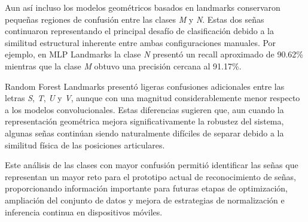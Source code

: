 	Aun así incluso los modelos geométricos basados en landmarks conservaron pequeñas regiones de confusión entre las clases \textit{M} y \textit{N}. Estas dos señas continuaron representando el principal desafío de clasificación debido a la similitud estructural inherente entre ambas configuraciones manuales. Por ejemplo, en MLP Landmarks la clase \textit{N} presentó un recall aproximado de 90.62\% mientras que la clase \textit{M} obtuvo una precisión cercana al 91.17\%.
	
	Random Forest Landmarks presentó ligeras confusiones adicionales entre las letras \textit{S}, \textit{T}, \textit{U} y \textit{V}, aunque con una magnitud considerablemente menor respecto a los modelos convolucionales. Estas diferencias sugieren que, aun cuando la representación geométrica mejora significativamente la robustez del sistema, algunas señas continúan siendo naturalmente difíciles de separar debido a la similitud física de las posiciones articulares.
	
	
	Este análisis de las clases con mayor confusión permitió identificar las señas que representan un mayor reto para el prototipo actual de reconocimiento de señas, proporcionando información importante para futuras etapas de optimización, ampliación del conjunto de datos y mejora de estrategias de normalización e inferencia continua en dispositivos móviles.
	
